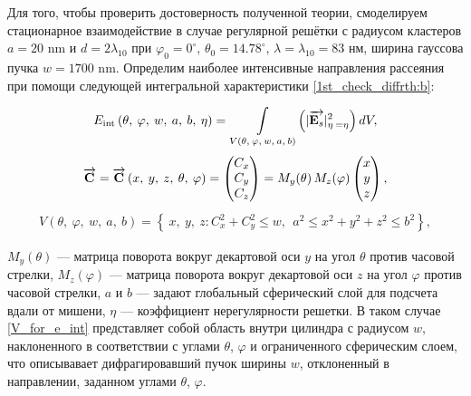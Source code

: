 
Для того, чтобы проверить достоверность полученной теории, смоделируем стационарное взаимодействие в случае регулярной решётки с радиусом кластеров $a = 20$ nm и $d = 2\lambda_{10}$ при $\varphi_0 = 0^{\circ}$, $\theta_0 = 14.78^{\circ}$, $\lambda = \lambda_{10} = 83$ нм, ширина гауссова пучка $w = 1700$ nm. Определим наиболее интенсивные направления рассеяния при помощи следующей интегральной характеристики \autoref{1st_check_diffrth:b}:

    \begin{align}
        E_{\textrm{int}} \left(\theta,\:\varphi, \:w, \:a, \:b, \:\eta\right) = \mathop{\int}\limits_{V\left(\theta,\:\varphi, \:w, \:a, \:b \right)} \left( |\overrightarrow{\textbf{E}_{s}}|^2_{\eta \:= \eta} \right) dV,
        \label{e_int}
    \end{align}
    \begin{align}
        \overrightarrow{\textbf{C}_{}} = \overrightarrow{\textbf{C}_{}}\left(x,\:y,\:z,\:\theta,\:\varphi \right) = \begin{pmatrix}C_{x}\\C_{y}\\C_{z}\end{pmatrix} = M_y(\theta)\,M_z(\varphi)\begin{pmatrix}x\\y\\z\end{pmatrix},
        \label{c_for_e_int}
    \end{align}
    \begin{align}
        V\left(\theta,\:\varphi, \:w, \:a, \:b \right) = \left\{\:x,\:y,\:z : C_{x}^2 + C_{y}^2 \leq w, \:\: a^2 \leq x^2 + y^2 + z^2 \leq b^2 \right\},
        \label{V_for_e_int}
    \end{align}

 $M_y(\theta)$ --- матрица поворота вокруг декартовой оси $y$ на угол $\theta$ против часовой стрелки, $M_z(\varphi)$ --- матрица поворота вокруг декартовой оси $z$ на угол $\varphi$ против часовой стрелки, $a$ и $b$ --- задают глобальный сферический слой для подсчета вдали от мишени, $\eta$ --- коэффициент нерегулярности решетки. В таком случае \autoref{V_for_e_int} представляет собой область внутри цилиндра с радиусом $w$, наклоненного в соответствии с углами $\theta$, $\varphi$ и ограниченного сферическим слоем, что описывавает дифрагировавший пучок ширины $w$, отклоненный в направлении, заданном углами $\theta$, $\varphi$.

